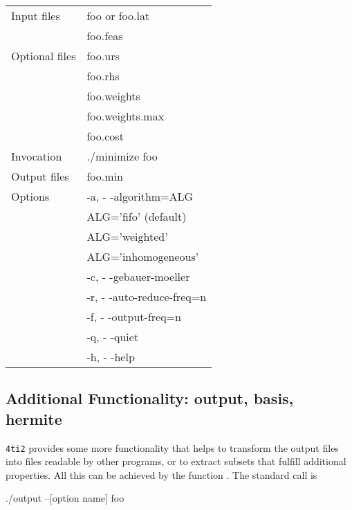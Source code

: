 \documentclass[12pt]{article}
\newenvironment{myverbatim}%
  {\quote\verbatim}%
  {\endverbatim\endquote}
\newcommand\Command{\begingroup \urlstyle{sf}\Url}
\theoremstyle{definition}
\newcommand{\FourTiTwo}{{\tt 4ti2}}
\begin{document}
\begin{center}
\begin{tabular}{|l|l|}
\hline
Input files    & foo or foo.lat \\
               & foo.feas \\
\hline
Optional files & foo.urs         \\
	       & foo.rhs         \\
               & foo.weights     \\
               & foo.weights.max \\
	       & foo.cost        \\
\hline
Invocation     & ./minimize foo \\
Output files   & foo.min        \\
\hline
Options        & -a, - -algorithm=ALG \\
               & ALG='fifo' (default) \\
	       & ALG='weighted' \\
	       & ALG='inhomogeneous' \\
	       & -c, - -gebauer-moeller \\
	       & -r, - -auto-reduce-freq=n \\
	       & -f, - -output-freq=n \\
	       & -q, - -quiet \\
	       & -h, - -help \\
\hline
\end{tabular}
\end{center}



\subsection{Additional Functionality: output, basis, hermite}
\FourTiTwo{} provides some more functionality that helps to transform
the output files into files readable by other programs, or to extract
subsets that fulfill additional properties. All this can be achieved
by the function \Command{output}. The standard call is

\begin{myverbatim}
./output --[option name] foo
\end{myverbatim}
\end{document}
